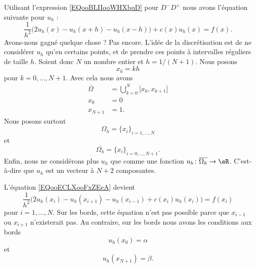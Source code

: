 	Utilisant l'expression \eqref{EQooBLIIooWHXbqD} pour \( D^-D^+\) nous avons l'équation suivante pour \( u_h\) :
	\begin{equation}        \label{EQooECLXooFxZEeA}
		\frac{1}{ h^2 }\Big( 2u_h(x)-u_h(x+h)-u_h(x-h) \Big)+c(x)u_h(x)=f(x).
	\end{equation}
	Avons-nous gagné quelque chose ? Pas encore. L'idée de la discrétisation est de ne considérer \( u_h\) qu'en certains points, et de prendre ces points à intervalles réguliers de taille \( h\). Soient donc \( N\) un nombre entier et \( h=1/(N+1)\). Nous posons
	\begin{equation}
		x_k=kh
	\end{equation}
	pour \( k=0,\ldots, N+1\). Avec cela nous avons
	\begin{subequations}
		\begin{align}
			\overline{ \Omega } & =\bigcup_{k=0}^{N}\mathopen[ x_k , x_{k+1} \mathclose]  \\
			x_0                 & =0                                                      \\
			x_{N+1}             & =1.
		\end{align}
	\end{subequations}
	Nous posons surtout
	\begin{equation}
		\Omega_h=\{ x_i \}_{i=1,\ldots, N}
	\end{equation}
	et
	\begin{equation}
		\overline{ \Omega_h }=\{ x_i \}_{i=0,\ldots, N+1}.
	\end{equation}
	Enfin, nous ne considérons plus \( u_h\) que comme une fonction \( u_h\colon \overline{ \Omega_h }\to \eR\). C'est-à-dire que \( u_h\) est un vecteur à \( N+2\) composantes.

	L'équation \eqref{EQooECLXooFxZEeA} devient
	\begin{equation}        \label{EQooZMVMooTqlpkF}
		\frac{1}{ h^2 }\big( 2u_h(x_i)-u_h(x_{i+1})-u_h(x_{i-1})+c(x_i)u_h(x_i) \big)=f(x_i)
	\end{equation}
	pour \( i=1,\ldots, N\). Sur les bords, cette équation n'est pas possible parce que \( x_{i-1}\) ou \( x_{i+1}\) n'existerait pas. Au contraire, sur les bords nous avons les conditions aux bords
	\begin{equation}
		u_h(x_0)=\alpha
	\end{equation}
	et
	\begin{equation}
		u_h(x_{N+1})=\beta.
	\end{equation}

